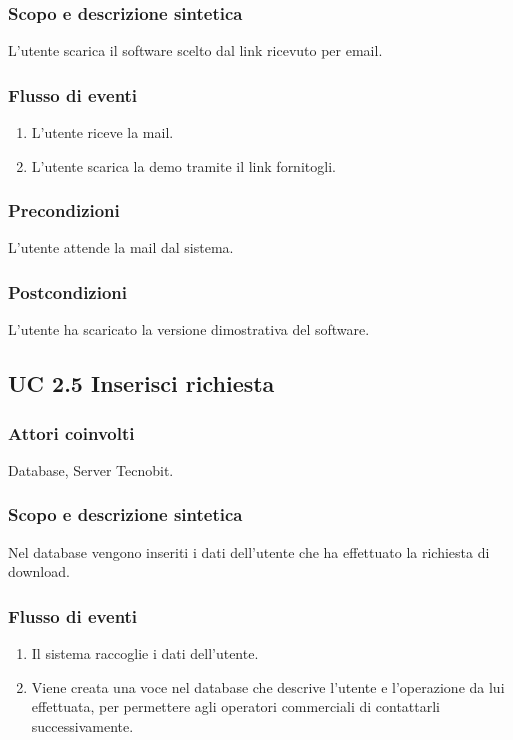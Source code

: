 \subsubsection*{Scopo e descrizione sintetica}
L'utente scarica il software scelto dal link ricevuto per email.
\subsubsection*{Flusso di eventi}
\begin{enumerate}
\item L'utente riceve la mail.
\item L'utente scarica la demo tramite il link fornitogli.
\end{enumerate}
\subsubsection*{Precondizioni} L'utente attende la mail dal sistema.
\subsubsection*{Postcondizioni} L'utente ha scaricato la versione dimostrativa del software.

\subsection*{UC 2.5 Inserisci richiesta}
\subsubsection*{Attori coinvolti}  
Database, Server Tecnobit. 
\subsubsection*{Scopo e descrizione sintetica}
Nel database vengono inseriti i dati dell'utente che ha effettuato la richiesta di download. 
\subsubsection*{Flusso di eventi}
\begin{enumerate}
\item Il sistema raccoglie i dati dell'utente.
\item Viene creata una voce nel database che descrive l'utente e l'operazione da lui effettuata, per permettere agli 
operatori commerciali di contattarli successivamente.
\end{enumerate}
